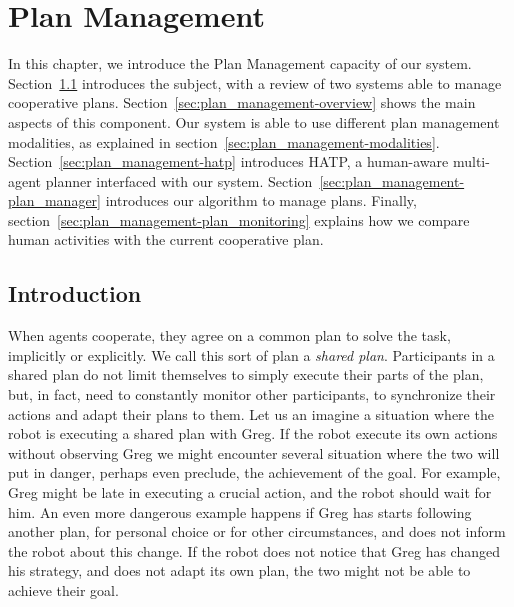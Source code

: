 
\chapter{Plan Management} %

\label{chapter:plan_management} %


In this chapter, we introduce the Plan Management capacity of our system. Section~\ref{sec:plan_management-intro} introduces the subject, with a review of two systems able to manage cooperative plans. Section~\ref{sec:plan_management-overview} shows the main aspects of this component. Our system is able to use different plan management modalities, as explained in section~\ref{sec:plan_management-modalities}. Section~\ref{sec:plan_management-hatp} introduces HATP, a human-aware multi-agent planner interfaced with our system. Section~\ref{sec:plan_management-plan_manager} introduces our algorithm to manage plans. Finally, section~\ref{sec:plan_management-plan_monitoring} explains how we compare human activities with the current cooperative plan.

\section{Introduction}
\label{sec:plan_management-intro}

When agents cooperate, they agree on a common plan to solve the task, implicitly or explicitly. We call this sort of plan a \textit{shared plan}.  Participants in a shared plan do not limit themselves to simply execute their parts of the plan, but, in fact, need to constantly monitor other participants, to synchronize their actions and adapt their plans to them. Let us an imagine a situation where the robot is executing a shared plan with Greg. If the robot execute its own actions without observing Greg we might encounter several situation where the two will put in danger, perhaps even preclude, the achievement of the goal. For example, Greg might be late in executing a crucial action, and the robot should wait for him. An even more dangerous example happens if Greg has starts following another plan, for personal choice or for other circumstances, and does not inform the robot about this change. If the robot does not notice that Greg has changed his strategy, and does not adapt its own plan, the two might not be able to achieve their goal.


